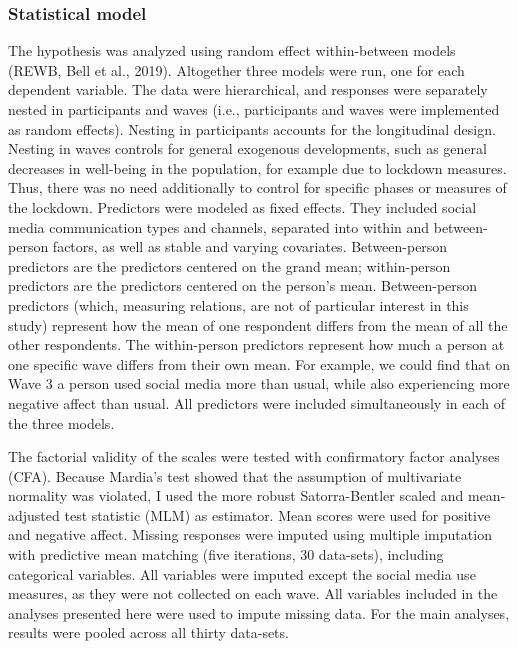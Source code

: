 \documentclass[
  man,mask,floatsintext]{apa7}
\begin{document}
\hypertarget{statistical-model}{%
\subsubsection{Statistical model}\label{statistical-model}}

The hypothesis was analyzed using random effect within-between models (REWB, Bell et al., 2019).
Altogether three models were run, one for each dependent variable.
The data were hierarchical, and responses were separately nested in participants and waves (i.e., participants and waves were implemented as random effects).
Nesting in participants accounts for the longitudinal design.
Nesting in waves controls for general exogenous developments, such as general decreases in well-being in the population, for example due to lockdown measures.
Thus, there was no need additionally to control for specific phases or measures of the lockdown.
Predictors were modeled as fixed effects.
They included social media communication types and channels, separated into within and between-person factors, as well as stable and varying covariates.
Between-person predictors are the predictors centered on the grand mean; within-person predictors are the predictors centered on the person's mean.
Between-person predictors (which, measuring relations, are not of particular interest in this study) represent how the mean of one respondent differs from the mean of all the other respondents.
The within-person predictors represent how much a person at one specific wave differs from their own mean.
For example, we could find that on Wave 3 a person used social media more than usual, while also experiencing more negative affect than usual.
All predictors were included simultaneously in each of the three models.

The factorial validity of the scales were tested with confirmatory factor analyses (CFA).
Because Mardia's test showed that the assumption of multivariate normality was violated, I used the more robust Satorra-Bentler scaled and mean-adjusted test statistic (MLM) as estimator.
Mean scores were used for positive and negative affect.
Missing responses were imputed using multiple imputation with predictive mean matching (five iterations, 30 data-sets), including categorical variables.
All variables were imputed except the social media use measures, as they were not collected on each wave.
All variables included in the analyses presented here were used to impute missing data.
For the main analyses, results were pooled across all thirty data-sets.
\end{document}
